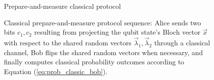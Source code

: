 \begin{figure}[tb]
\begin{center}
\begin{msc}[msc keyword=, instance width=3.6cm]{Prepare-and-measure classical protocol}
\nextlevel[3]
\nextlevel[3]
\nextlevel[1]
\nextlevel[3]
\nextlevel[2]
\end{msc}
\end{center}
\caption{Classical prepare-and-measure protocol sequence: Alice sends two bits $c_1, c_2$ resulting from projecting the qubit state's Bloch vector $\vec{x}$ with respect to the shared random vectors $\vec{\lambda}_1, \vec{\lambda}_2$ through a classical channel, Bob flips the shared random vectors when necessary, and finally computes classical probability outcomes according to Equation (\ref{eq:prob_classic_bob}).}
\label{fig:msc_pm}
\end{figure}



